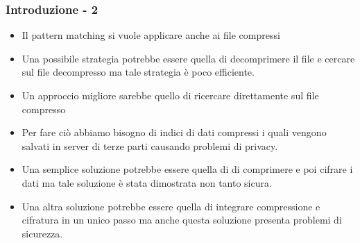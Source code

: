 \documentclass{beamer}
\begin{document}
\begin{frame}
\frametitle{Introduzione - 2}
	\begin{itemize}
		\item Il pattern matching si vuole applicare anche ai file compressi
		
		\item Una possibile strategia potrebbe essere quella di decomprimere il file e cercare sul file decompresso ma tale strategia è poco efficiente.
		
		\item Un approccio migliore sarebbe quello di ricercare direttamente sul file compresso 
		\item Per fare ciò abbiamo bisogno di indici di dati compressi i quali vengono salvati in server di terze parti causando problemi di privacy. 
		
		\item Una semplice soluzione potrebbe essere quella di di comprimere e poi cifrare i dati ma tale soluzione è stata dimostrata non tanto sicura.
		
		\item Una altra soluzione potrebbe essere quella di integrare compressione e cifratura in un unico passo ma anche questa soluzione presenta problemi di sicurezza.
		
	\end{itemize}
\end{frame}
\end{document}
